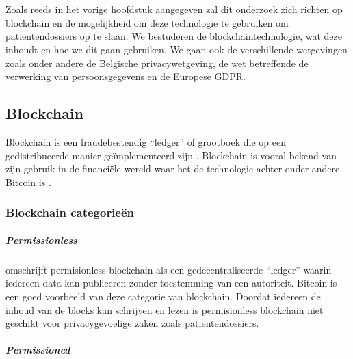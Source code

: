 \chapter{}
\label{ch:stand-van-zaken}

Zoals reeds in het vorige hoofdstuk aangegeven zal dit onderzoek zich richten op blockchain en de mogelijkheid om deze technologie te gebruiken om patiëntendossiers op te slaan. We bestuderen de blockchaintechnologie, wat deze inhoudt en hoe we dit gaan gebruiken. We gaan ook de verschillende wetgevingen zoals onder andere de Belgische privacywetgeving, de wet betreffende de verwerking van persoonsgegevens en de Europese GDPR.
\section{Blockchain}
\label{ch:blockchain}

Blockchain is een fraudebestendig ``ledger'' of grootboek die op een gedistribueerde manier geïmplementeerd zijn \autocite{Yaga2018}. Blockchain is vooral bekend van zijn gebruik in de financiële wereld waar het de technologie achter onder andere Bitcoin is \autocite{Nofer2017}. 

\subsection{Blockchain categorieën}

\paragraph{Permissionless}

\textcite{Yaga2018} omschrijft permisionless blockchain als een gedecentraliseerde ``ledger'' waarin iedereen data kan publiceren zonder toestemming van een autoriteit. Bitcoin is een goed voorbeeld van deze categorie van blockchain. Doordat iedereen de inhoud van de blocks kan schrijven en lezen is permisionless blockchain niet geschikt voor privacygevoelige zaken zoals patiëntendossiers.


\paragraph{Permissioned}

